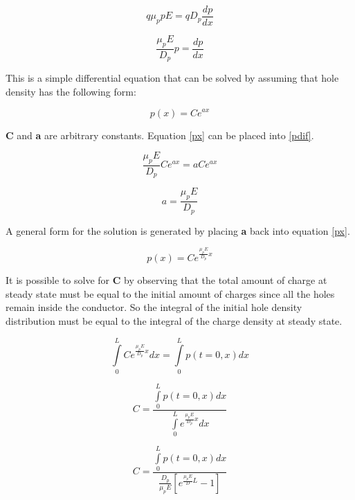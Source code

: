 \begin{doublespace}
\begin{equation}
q \mu_{p} p E=qD_{p} \frac{dp}{dx}
\end{equation}

\begin{equation}
 \frac{\mu_{p} E}{D_{p}} p  = \frac{dp}{dx}
 \label{pdif}
\end{equation}

This is a simple differential equation that can be solved by assuming that hole density has the following form:

\begin{equation}
p(x)=Ce^{ax}
\label{px}
\end{equation}

\textbf{C} and \textbf{a} are arbitrary constants. Equation \eqref{px} can be placed into \eqref{pdif}.

\begin{equation}
 \frac{\mu_{p} E}{D_{p}} Ce^{ax}  = a Ce^{ax}
\end{equation}

\begin{equation}
a=\frac{\mu_{p} E}{D_{p}}
\end{equation}

 A general form for the solution is generated by placing \textbf{a} back into equation \eqref{px}.
 
\begin{equation}
p(x)=Ce^{\frac{\mu_{p} E}{D_{p}}x}
\label{p_ss}
\end{equation}

It is possible to solve for \textbf{C} by observing that the total amount of charge at steady state must be equal to the initial amount of charges since all the holes remain inside the conductor. So the integral of the initial hole density distribution must be equal to the integral of the charge density at steady state.


\begin{equation}\nonumber
\int\limits_{0}^{L}Ce^{\frac{\mu_{p} E}{D_{p}}x}dx=\int\limits_{0}^{L}p(t=0,x)dx
\end{equation}

\begin{equation}\nonumber
C=\frac{\int\limits_{0}^{L}p(t=0,x)dx}{\int\limits_{0}^{L}e^{\frac{\mu_{p} E}{D_{p}}x}dx}
\end{equation}

\begin{equation}
C=\frac{\int\limits_{0}^{L}p(t=0,x)dx}{\frac{D_p}{\mu_p E}[e^{\frac{\mu_p E}{D} L} -1]}
\label{p_ss_c}
\end{equation}


\end{doublespace}
